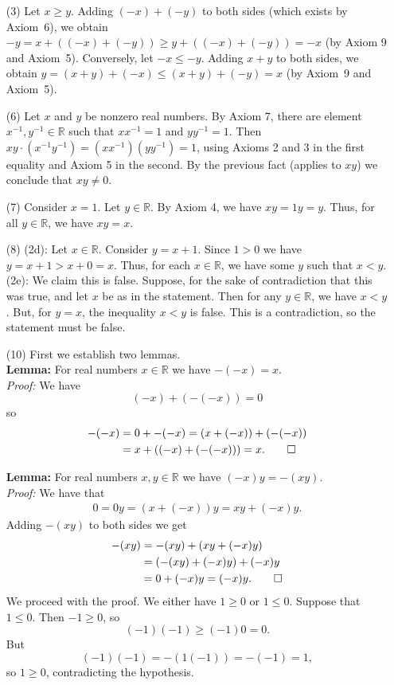 \documentclass[12pt]{amsart}
\newcommand{\R}{{\mathbb{R}}}
\numberwithin{equation}{section}
\theoremstyle{plain} %
\theoremstyle{definition}
\theoremstyle{remark}
\begin{document}
\begin{framed}
\begin{enumerate}
\item[(3)] Let $x\geq y$. Adding $(-x) + (-y)$ to both sides (which exists by Axiom~6), we obtain $-y=x+((-x)+ (-y)) \geq y+((-x)+(-y)) = -x$ (by Axiom 9 and Axiom~5).
	Conversely, let $-x \leq -y$. Adding $x+y$ to both sides, we obtain $y=(x+y)+(-x) \leq (x+y)+(-y) = x$ (by Axiom~9 and Axiom~5).
\item[(6)] Let $x$ and $y$ be nonzero real numbers. By Axiom 7, there are element $x^{-1},y^{-1}\in \R$ such that $x x^{-1}=1$ and $y y^{-1}=1$. Then $xy \cdot (x^{-1}y^{-1}) = (x x^{-1}) (y y^{-1}) =1$, using Axioms 2 and 3 in the first equality and Axiom 5 in the second. By the previous fact (applies to $xy$) we conclude that $xy\neq 0$.
\item[(7)] Consider $x=1$. Let $y\in \R$. By Axiom 4, we have $x y= 1 y =y$. Thus, for all $y\in \R$, we have $xy=x$.
\item[(8)] (2d):  Let $x\in \R$. Consider $y=x+1$. Since $1>0$ we have $y=x+1 > x+0 = x$. Thus, for each $x\in \R$, we have some $y$ such that $x<y$.
(2e): We claim this is false. Suppose, for the sake of contradiction that this was true, and let $x$ be as in the statement. Then for any $y\in \R$, we have $x<y$. But, for $y=x$, the inequality $x<y$ is false. This is a contradiction, so the statement must be false.

\item[(10)] First we establish two lemmas.
\\ \textbf{Lemma:} For real numbers $x\in\R$ we have $-(-x)=x$.
\\ \textit{Proof:} We have \[(-x) + (-(-x))=0\] so \begin{align*}  -(-x) &= 0 + -(-x) = (x+ (-x) )+ (-(-x)) \\&= x+ ((-x) + (-(-x)))=x.\qed\end{align*}

\noindent \textbf{Lemma:} For real numbers $x,y\in\R$ we have $(-x)y= -(xy)$.
\\ \textit{Proof:} We have that \begin{align*} 0 = 0 y= (x+ (-x)) y = xy + (-x)y.\end{align*} Adding $-(xy)$ to both sides we get  \begin{align*} -(xy) &= -(xy) + ( xy + (-x)y ) \\&= (-(xy) + (-x) y) + (-x)y \\&= 0 + (-x)y = (-x)y.\qed\end{align*}
  We proceed with the proof. We either have $1\geq 0$ or $1\leq 0$. Suppose that $1\leq 0$. Then $-1 \geq 0$, so \[(-1)(-1) \geq (-1) 0 = 0.\] But \[(-1)(-1) = - (1 (-1)) = - (-1) = 1,\] so $1 \geq 0$, contradicting the hypothesis.
\end{enumerate}
\end{framed}
\end{document}
